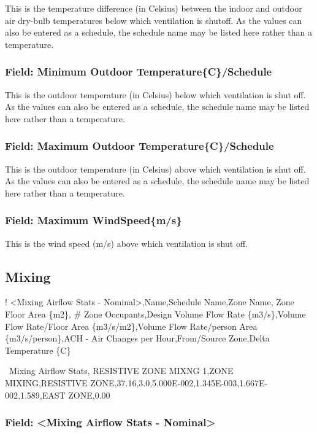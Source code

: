 This is the temperature difference (in Celsius) between the indoor and outdoor air dry-bulb temperatures below which ventilation is shutoff. As the values can also be entered as a schedule, the schedule name may be listed here rather than a temperature.

\subsubsection{Field: Minimum Outdoor Temperature\{C\}/Schedule}\label{field-minimum-outdoor-temperaturecschedule}

This is the outdoor temperature (in Celsius) below which ventilation is shut off. As the values can also be entered as a schedule, the schedule name may be listed here rather than a temperature.

\subsubsection{Field: Maximum Outdoor Temperature\{C\}/Schedule}\label{field-maximum-outdoor-temperaturecschedule}

This is the outdoor temperature (in Celsius) above which ventilation is shut off. As the values can also be entered as a schedule, the schedule name may be listed here rather than a temperature.

\subsubsection{Field: Maximum WindSpeed\{m/s\}}\label{field-maximum-windspeedms}

This is the wind speed (m/s) above which ventilation is shut off.

\subsection{Mixing}\label{mixing}

! \textless{}Mixing Airflow Stats - Nominal\textgreater{},Name,Schedule Name,Zone Name, Zone Floor Area \{m2\}, \# Zone Occupants,Design Volume Flow Rate \{m3/s\},Volume Flow Rate/Floor Area \{m3/s/m2\},Volume Flow Rate/person Area \{m3/s/person\},ACH - Air Changes per Hour,From/Source Zone,Delta Temperature \{C\}

~Mixing Airflow Stats, RESISTIVE ZONE MIXNG 1,ZONE MIXING,RESISTIVE ZONE,37.16,3.0,5.000E-002,1.345E-003,1.667E-002,1.589,EAST ZONE,0.00

\subsubsection{Field: \textless{}Mixing Airflow Stats - Nominal\textgreater{}}\label{field-mixing-airflow-stats---nominal}

